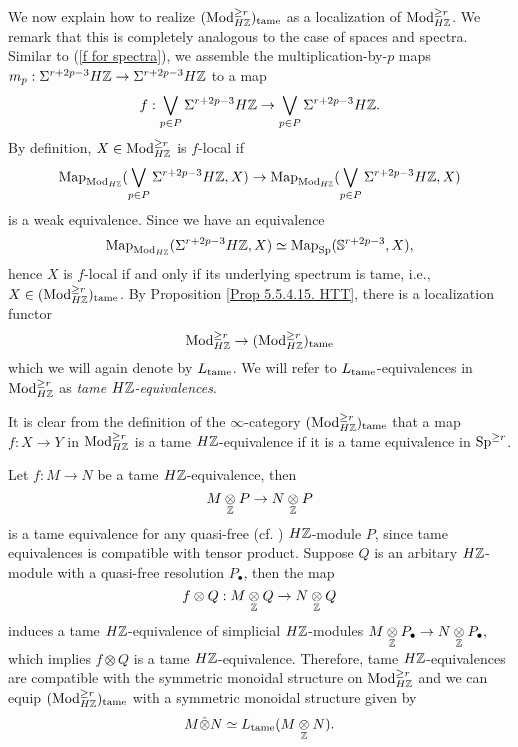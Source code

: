\begin{construction}
We now explain how to realize $(\operatorname{Mod}^{\geq r}_{H{\mathbb{Z}}})_{\operatorname{\operatorname{tame}}}$ as a localization of 
$\operatorname{Mod}^{\geq r}_{H{\mathbb{Z}}}$. We remark that this is completely analogous to the case of spaces and spectra.
Similar to (\ref{f for spectra}), we assemble the multiplication-by-$p$ maps
$
m_p: \Sigma^{r+2p-3}H{\mathbb{Z}}
\to 
\Sigma^{r+2p-3}H{\mathbb{Z}}
$
to a map
\begin{equation}
	f: \bigvee_{p\in P}\Sigma^{r+2p-3} H{\mathbb{Z}} \to \bigvee_{p\in P}\Sigma^{r+2p-3} H{\mathbb{Z}}.
\end{equation}
By definition, $X\in \operatorname{Mod}^{\geq r}_{H{\mathbb{Z}}}$ is $f$-local if $$
\operatorname{Map}_{\operatorname{Mod}_{H{\mathbb{Z}}}}(\bigvee_{p\in P}\Sigma^{r+2p-3} H{\mathbb{Z}}, X) 
\to 
\operatorname{Map}_{\operatorname{Mod}_{H{\mathbb{Z}}}}(\bigvee_{p\in P}\Sigma^{r+2p-3} H{\mathbb{Z}}, X) 
$$
is a weak equivalence. 
Since we have an equivalence
$$
\operatorname{Map}_{\operatorname{Mod}_{H{\mathbb{Z}}}}(\Sigma^{r+2p-3} H{\mathbb{Z}}, X)
\simeq 
\operatorname{Map}_{\operatorname{Sp}}({\mathbb{S}}^{r+2p-3}, X),
$$
hence $X$ is $f$-local if and only if its underlying spectrum is tame, i.e., $X\in (\operatorname{Mod}^{\geq r}_{H{\mathbb{Z}}})_{\operatorname{\operatorname{tame}}}$. By Proposition \ref{Prop 5.5.4.15. HTT}, there is a localization functor 
$$
\operatorname{Mod}^{\geq r}_{H{\mathbb{Z}}} \to
(\operatorname{Mod}^{\geq r}_{H{\mathbb{Z}}})_{\operatorname{\operatorname{tame}}}
$$
which we will again denote by $L_{\operatorname{\operatorname{tame}}}$. We will refer to $L_{\operatorname{\operatorname{tame}}}$-equivalences in $\operatorname{Mod}^{\geq r}_{H{\mathbb{Z}}}$ as \emph{tame $H{\mathbb{Z}}$-equivalences}.

It is clear from the definition of the $\infty$-category $(\operatorname{Mod}^{\geq r}_{H{\mathbb{Z}}})_{\operatorname{\operatorname{tame}}}$ that a map $f:X \to Y$ in $\operatorname{Mod}^{\geq r}_{H{\mathbb{Z}}}$ is a tame $H{\mathbb{Z}}$-equivalence if it is a tame equivalence in $\operatorname{Sp}^{\geq r}$.

\begin{remark}
Let $f:M\to N$ be a tame $H{\mathbb{Z}}$-equivalence, then 
$$
M\underset{{\mathbb{Z}}}{\otimes} P \to N \underset{{\mathbb{Z}}}{\otimes} P
$$
is a tame equivalence for any quasi-free (cf. \cite[Definition 7.2.1.16.]{HA}) $H{\mathbb{Z}}$-module $P$, since tame equivalences is compatible with tensor product.
Suppose $Q$ is an arbitary $H{\mathbb{Z}}$-module with a quasi-free resolution $P_{\bullet}$, then the map
$$
f\otimes Q: M\underset{{\mathbb{Z}}}{\otimes} Q \to 
N\underset{{\mathbb{Z}}}{\otimes} Q
$$
induces a tame $H{\mathbb{Z}}$-equivalence of simplicial $H{\mathbb{Z}}$-modules
$
M \underset{{\mathbb{Z}}}{\otimes} P_{\bullet}
\to 
N \underset{{\mathbb{Z}}}{\otimes} P_{\bullet},
$
which implies 
$
f\otimes Q
$
is a tame $H{\mathbb{Z}}$-equivalence.
Therefore, tame $H{\mathbb{Z}}$-equivalences are compatible with the symmetric monoidal structure on $\operatorname{Mod}_{H{\mathbb{Z}}}^{\geq r}$ and we can equip $(\operatorname{Mod}^{\geq r}_{H{\mathbb{Z}}})_{\operatorname{\operatorname{tame}}}$ with a symmetric monoidal structure given by
$$
M\hat{\otimes} N \simeq L_{\operatorname{\operatorname{tame}}} (M\underset{{\mathbb{Z}}}{\otimes} N).
$$
\end{remark}


\end{construction}
